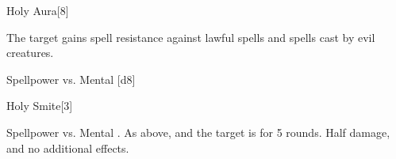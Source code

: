 \begin{spellsection}{Holy Aura}[8]
    \begin{spellheader}
    \end{spellheader}
    \begin{spellcontent}
        \begin{spelltargetinginfo}
        \end{spelltargetinginfo}
        \begin{spelleffects}
            \spelleffect The target gains spell resistance against lawful spells and spells cast by evil creatures.
            \spelldur \durshort \dismissable
        \end{spelleffects}
    \end{spellcontent}
    \begin{spellsubcontent}
        \begin{spelltargetinginfo}
        \end{spelltargetinginfo}
        \begin{spelleffects}
            \begin{spellattack}{Spellpower vs. Mental}
                \spellsuccess {}[d8]
            \end{spellattack}
        \end{spelleffects}
    \end{spellsubcontent}
    \begin{spellfooter}
        \miscastexplode
    \end{spellfooter}
\end{spellsection}

\begin{spellsection}{Holy Smite}[3]
    \begin{spellheader}
    \end{spellheader}
    \begin{spellcontent}
        \begin{spelltargetinginfo}
        \end{spelltargetinginfo}
        \begin{spelleffects}
            \begin{spellattack}{Spellpower vs. Mental}
                \spellsuccess {}.
                \spellcritical As above, and the target is \dazed for 5 rounds.
                \spellfailure Half damage, and no additional effects.
            \end{spellattack}
        \end{spelleffects}
    \end{spellcontent}
    \begin{spellfooter}
        \miscastrandom
    \end{spellfooter}
\end{spellsection}

